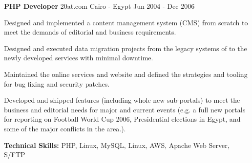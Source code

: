 \begin{cventries}
	\cventry
	{\textbf{PHP Developer}} %
	{20at.com} %
	{Cairo - Egypt} %
	{Jun 2004 - Dec 2006} %
	{
		\begin{cvitems} %
			\item {Designed and implemented a content management system (CMS) from scratch to meet the demands of editorial
			            and business requirements.}
			\item {Designed and executed data migration projects from the legacy systems of to the newly developed services
			            with minimal downtime.}
			\item {Maintained the online services and website and defined the strategies and tooling for bug fixing and
			            security patches.}
			\item {Developed and shipped features (including whole new sub-portals) to meet the business and editorial needs
			            for major and current events (e.g. a full new portals for reporting on Football World Cup 2006,
			            Presidential elections in Egypt, and some of the major conflicts in the area.).}
			\item {\textbf{Technical Skills:} PHP, Linux, MySQL, Linux, AWS, Apache Web Server, S/FTP}
		\end{cvitems}
	}
\end{cventries}
